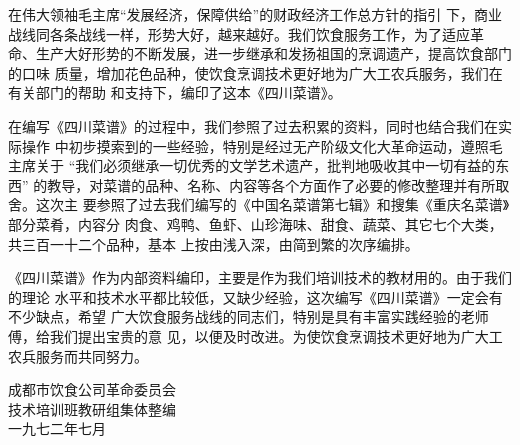 \begin{center}
\Large
{}
\end{center}

在伟大领袖毛主席{\sffamily“发展经济，保障供给”}的财政经济工作总方针的指引
下，商业战线同各条战线一样，形势大好，越来越好。我们饮食服务工作，为了适应革
命、生产大好形势的不断发展，进一步继承和发扬祖国的烹调遗产，提高饮食部门的口味
质量，增加花色品种，使饮食烹调技术更好地为广大工农兵服务，我们在有关部门的帮助
和支持下，编印了这本《四川菜谱》。

在编写《四川菜谱》的过程中，我们参照了过去积累的资料，同时也结合我们在实际操作
中初步摸索到的一些经验，特别是经过无产阶级文化大革命运动，遵照毛主席关于%
{\sffamily“我们必须继承一切优秀的文学艺术遗产，批判地吸收其中一切有益的东西”}%
的教导，对菜谱的品种、名称、内容等各个方面作了必要的修改整理并有所取舍。这次主
要参照了过去我们编写的《中国名菜谱第七辑》和搜集《重庆名菜谱》部分菜肴，内容分
肉食、鸡鸭、鱼虾、山珍海味、甜食、蔬菜、其它七个大类，共三百一十二个品种，基本
上按由浅入深，由简到繁的次序编排。

《四川菜谱》作为内部资料编印，主要是作为我们培训技术的教材用的。由于我们的理论
水平和技术水平都比较低，又缺少经验，这次编写《四川菜谱》一定会有不少缺点，希望
广大饮食服务战线的同志们，特别是具有丰富实践经验的老师傅，给我们提出宝贵的意
见，以便及时改进。为使饮食烹调技术更好地为广大工农兵服务而共同努力。

\begin{flushright}
成都市饮食公司革命委员会%
	\mbox{\hspace{2em}}\\
技术培训班教研组集体整编%
	\mbox{\hspace{2em}}\\
一九七二年七月%
	\mbox{\hspace{4em}}
\end{flushright}

